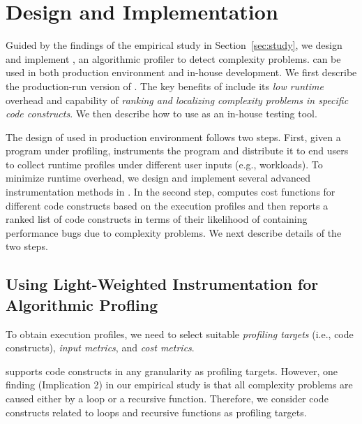 \section{\Tool Design and Implementation}
\label{sec:online}


Guided by the findings of the empirical study in Section~\ref{sec:study},
we design and implement \Tool, an algorithmic
profiler to detect complexity problems. \Tool
can be used in both production environment 
and in-house development. We first describe
the production-run version of \Tool. 
The key benefits of \Tool include its \emph{low runtime} 
overhead and capability of \emph{ranking 
and localizing complexity problems in specific code constructs}. 
We then describe how to use \Tool as an in-house testing tool. 

The design of \Tool used in production environment 
follows two steps. First, given a program under profiling,
\Tool instruments the program and
distribute it to end users to collect runtime profiles
under different user inputs (e.g., workloads). 
To minimize runtime overhead, we design and implement
several advanced instrumentation methods in \Tool. 
In the second step, \Tool computes cost functions for
different code constructs based on the execution profiles
and then reports a ranked list of code constructs in
terms of their likelihood of containing performance bugs due to
complexity problems.  
We next describe details of the two steps. 


\subsection{Using Light-Weighted Instrumentation 
for Algorithmic Profling}
\label{sec:opt}

To obtain execution profiles, we need to select suitable 
\emph{profiling targets} (i.e.,
code constructs), \emph{input metrics}, and \emph{cost metrics}. 

\Tool supports code constructs in any granularity as profiling targets. 
However, one finding (Implication 2) in our empirical study is 
that all complexity problems are 
caused either by a loop or a recursive function. 
Therefore, we consider code constructs related 
to loops and recursive functions as profiling targets. 


